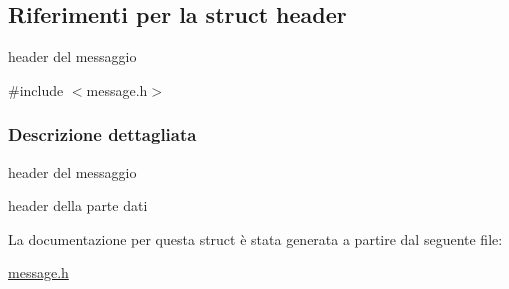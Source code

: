 \hypertarget{structheader}{}\subsection{Riferimenti per la struct header}
\label{structheader}


header del messaggio  




{\ttfamily \#include $<$message.\+h$>$}



\subsubsection{Descrizione dettagliata}
header del messaggio 

header della parte dati 

La documentazione per questa struct è stata generata a partire dal seguente file\+:\begin{DoxyCompactItemize}
\item 
\mbox{\hyperlink{message_8h}{message.\+h}}\end{DoxyCompactItemize}
